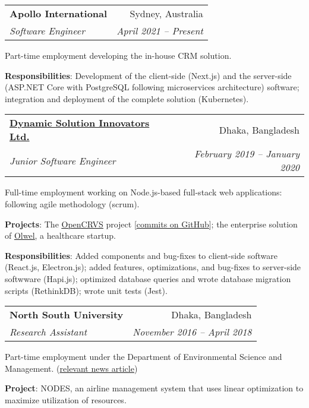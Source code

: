 \documentclass[a4-paper,10pt]{article}
\makeatletter
\newcommand{\resumeItem}[2]{
  \item\small{
    \textbf{#1}{: #2 \vspace{-2pt}}
  }
}
\newcommand{\resumeSubheading}[4]{
  \vspace{-1pt}\item
    \begin{tabular*}{0.97\textwidth}[t]{l@{\extracolsep{\fill}}r}
      \textbf{#1} & #2 \\
      \textit{#3} & \textit{ #4} \\
    \end{tabular*}\vspace{-5pt}
}
\newcommand{\resumeSubSubheading}[2]{
    \begin{tabular*}{0.97\textwidth}{l@{\extracolsep{\fill}}r}
      \textit{\small#1} & \textit{\small #2} \\
    \end{tabular*}\vspace{-5pt}
}
\newcommand{\resumeSubHeadingListEnd}{\end{itemize}}
\newcommand{\resumeItemListStart}{\begin{itemize}}
\newcommand{\resumeItemListEnd}{\end{itemize}\vspace{-5pt}}
\makeatother
\begin{document}
    \resumeSubheading
      {Apollo International}{Sydney, Australia}
      {Software Engineer}{April 2021 -- Present}
      
      Part-time employment developing the in-house CRM solution.
      
      \textbf{Responsibilities}: Development of the client-side (Next.js) and the server-side (ASP.NET Core with PostgreSQL following microservices architecture) software; integration and deployment of the complete solution (Kubernetes).

    \resumeSubheading
      {\href{http://dsinnovators.com/}{Dynamic Solution Innovators Ltd.}}{Dhaka, Bangladesh}
      {Junior Software Engineer}{February 2019 -- January 2020}
      
      Full-time employment working on Node.js-based full-stack web applications:  following agile methodology (scrum).
      
      \textbf{Projects}: The \href{https://opencrvs.org}{\underline{OpenCRVS}} project [\href{https://github.com/opencrvs/opencrvs-core/commits?author=maacpiash}{\underline{commits on GitHub}}]; the enterprise solution of \href{https://olwel.com}{\underline{Olwel}}, a healthcare startup.
      
      \textbf{Responsibilities}: Added components and bug-fixes to client-side software (React.js, Electron.js); added features, optimizations, and bug-fixes to server-side softwware (Hapi.js); optimized database queries and wrote database migration scripts (RethinkDB); wrote unit tests (Jest).
      

    \resumeSubheading
      {North South University}{Dhaka, Bangladesh}
      {Research Assistant}{November 2016 -- April 2018}
      
      Part-time employment under the Department of Environmental Science and Management. (\href{http://www.ipsnews.net/2017/05/flying-green-in-bangladesh/}{\underline{relevant news article}})
      
      \textbf{Project}: NODES, an airline management system that uses linear optimization to maximize utilization of resources.
      
\end{document}
